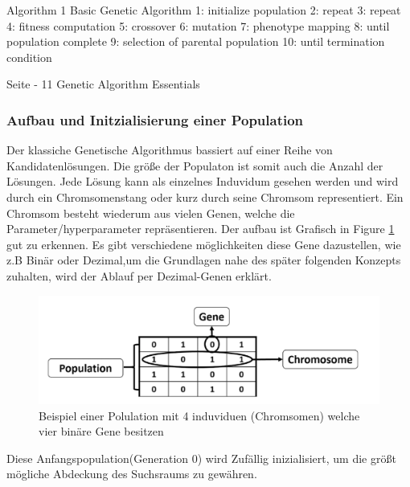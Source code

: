 Algorithm 1 Basic Genetic Algorithm
1: initialize population
2: repeat
3: 		repeat
4:			fitness computation
5:			crossover
6:			mutation
7:			phenotype mapping
8:		until population complete
9:		selection of parental population
10: until termination condition

Seite - 11 Genetic Algorithm Essentials
\fi 

\subsubsection{Aufbau und Initzialisierung einer Population}
Der klassiche Genetische Algorithmus bassiert auf einer Reihe von Kandidatenlösungen. Die größe der Populaton ist somit auch die Anzahl der Lösungen. Jede Lösung kann als einzelnes Induvidum gesehen werden und wird durch ein Chromsomenstang oder kurz durch seine Chromsom representiert. Ein Chromsom besteht wiederum aus vielen Genen, welche die Parameter/hyperparameter repräsentieren. Der aufbau ist Grafisch in Figure \ref{fig:chromosome} gut zu erkennen. Es gibt verschiedene möglichkeiten diese Gene dazustellen, wie z.B Binär oder Dezimal,um die Grundlagen nahe des später folgenden Konzepts zuhalten, wird der Ablauf per Dezimal-Genen erklärt.

\noindent%
\begin{figure}[H]
  \centering  
  \includegraphics[scale=0.3]{img/Chromsome-s134-PracticalComputerVion.png}
  \caption{Beispiel einer Polulation mit 4 induviduen (Chromsomen) welche vier binäre Gene besitzen \cite{Rashid2017} }
  \label{fig:chromosome}
\end{figure}

Diese Anfangspopulation(Generation 0) wird Zufällig inizialisiert, um die größt mögliche Abdeckung des Suchsraums zu gewähren. 



